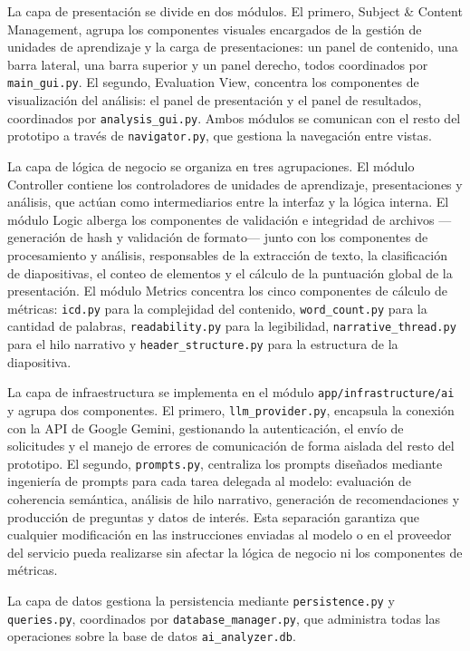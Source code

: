 \documentclass[11pt]{article}
\begin{document}
La capa de presentación se divide en dos módulos. El primero, Subject \& Content Management, agrupa los componentes visuales encargados de la gestión de unidades de aprendizaje y la carga de presentaciones: un panel de contenido, una barra lateral, una barra superior y un panel derecho, todos coordinados por \texttt{main\_gui.py}. El segundo, Evaluation View, concentra los componentes de visualización del análisis: el panel de presentación y el panel de resultados, coordinados por \texttt{analysis\_gui.py}. Ambos módulos se comunican con el resto del prototipo a través de \texttt{navigator.py}, que gestiona la navegación entre vistas.

La capa de lógica de negocio se organiza en tres agrupaciones. El módulo Controller contiene los controladores de unidades de aprendizaje, presentaciones y análisis, que actúan como intermediarios entre la interfaz y la lógica interna. El módulo Logic alberga los componentes de validación e integridad de archivos —generación de hash y validación de formato— junto con los componentes de procesamiento y análisis, responsables de la extracción de texto, la clasificación de diapositivas, el conteo de elementos y el cálculo de la puntuación global de la presentación. El módulo Metrics concentra los cinco componentes de cálculo de métricas: \texttt{icd.py} para la complejidad del contenido, \texttt{word\_count.py} para la cantidad de palabras, \texttt{readability.py} para la legibilidad, \texttt{narrative\_thread.py} para el hilo narrativo y \texttt{header\_structure.py} para la estructura de la diapositiva.

La capa de infraestructura se implementa en el módulo \texttt{app/infrastructure/ai} y agrupa dos componentes. El primero, \texttt{llm\_provider.py}, encapsula la conexión con la API de Google Gemini, gestionando la autenticación, el envío de solicitudes y el manejo de errores de comunicación de forma aislada del resto del prototipo. El segundo, \texttt{prompts.py}, centraliza los prompts diseñados mediante ingeniería de prompts para cada tarea delegada al modelo: evaluación de coherencia semántica, análisis de hilo narrativo, generación de recomendaciones y producción de preguntas y datos de interés. Esta separación garantiza que cualquier modificación en las instrucciones enviadas al modelo o en el proveedor del servicio pueda realizarse sin afectar la lógica de negocio ni los componentes de métricas.

La capa de datos gestiona la persistencia mediante \texttt{persistence.py} y \texttt{queries.py}, coordinados por \texttt{database\_manager.py}, que administra todas las operaciones sobre la base de datos \texttt{ai\_analyzer.db}.
\end{document}
